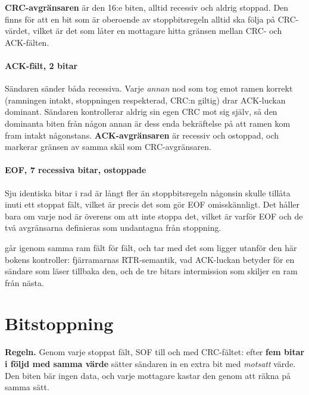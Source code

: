 \textbf{CRC-avgränsaren} är den 16:e biten, alltid recessiv och aldrig stoppad. Den finns för att en
bit som är oberoende av stoppbitsregeln alltid ska följa på CRC-värdet, vilket är det som låter en
mottagare hitta gränsen mellan CRC- och ACK-fälten.

\paragraph{ACK-fält, 2 bitar}
Sändaren sänder båda recessiva. Varje \emph{annan} nod som tog emot ramen korrekt (ramningen intakt,
stoppningen respekterad, CRC:n giltig) drar ACK-luckan dominant. Sändaren kontrollerar aldrig sin
egen CRC mot sig själv, så den dominanta biten från någon annan är dess enda bekräftelse på att ramen
kom fram intakt någonstans. \textbf{ACK-avgränsaren} är recessiv och ostoppad, och markerar gränsen
av samma skäl som CRC-avgränsaren.

\paragraph{EOF, 7 recessiva bitar, ostoppade}
Sju identiska bitar i rad är långt fler än stoppbitsregeln någonsin skulle tillåta inuti ett stoppat
fält, vilket är precis det som gör EOF omisskännligt. Det håller bara om varje nod är överens om att
inte stoppa det, vilket är varför EOF och de två avgränsarna definieras som undantagna från
stoppning.

 går igenom samma ram fält för fält, och tar med det som ligger utanför den här bokens
kontroller: fjärramarnas RTR-semantik, vad ACK-luckan betyder för en sändare som läser tillbaka den,
och de tre bitars intermission som skiljer en ram från nästa.

\section{Bitstoppning}
\label{c10:sec:stuffing}

\textbf{Regeln.} Genom varje stoppat fält, SOF till och med CRC-fältet: efter \textbf{fem bitar i
följd med samma värde} sätter sändaren in en extra bit med \emph{motsatt} värde. Den biten bär ingen
data, och varje mottagare kastar den genom att räkna på samma sätt.

